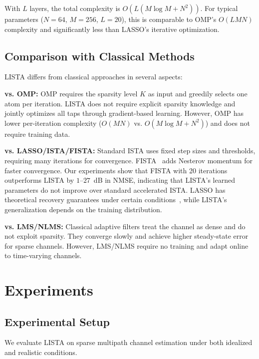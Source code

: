 \documentclass[a4paper,fleqn]{cas-sc}
\begin{document}
With $L$ layers, the total complexity is $O(L(M \log M + N^2))$. For typical parameters ($N=64$, $M=256$, $L=20$), this is comparable to OMP's $O(LMN)$ complexity and significantly less than LASSO's iterative optimization.

\subsection{Comparison with Classical Methods}

LISTA differs from classical approaches in several aspects:

\textbf{vs. OMP:} OMP requires the sparsity level $K$ as input and greedily selects one atom per iteration. LISTA does not require explicit sparsity knowledge and jointly optimizes all taps through gradient-based learning. However, OMP has lower per-iteration complexity ($O(MN)$ vs. $O(M \log M + N^2)$) and does not require training data.

\textbf{vs. LASSO/ISTA/FISTA:} Standard ISTA uses fixed step sizes and thresholds, requiring many iterations for convergence. FISTA~\citep{beck2009fast} adds Nesterov momentum for faster convergence. Our experiments show that FISTA with 20 iterations outperforms LISTA by $1$--$27$~dB in NMSE, indicating that LISTA's learned parameters do not improve over standard accelerated ISTA. LASSO has theoretical recovery guarantees under certain conditions~\citep{candes2006robust}, while LISTA's generalization depends on the training distribution.

\textbf{vs. LMS/NLMS:} Classical adaptive filters treat the channel as dense and do not exploit sparsity. They converge slowly and achieve higher steady-state error for sparse channels. However, LMS/NLMS require no training and adapt online to time-varying channels.


\section{Experiments}\label{sec:experiments}

\subsection{Experimental Setup}

We evaluate LISTA on sparse multipath channel estimation under both idealized and realistic conditions.
\end{document}
